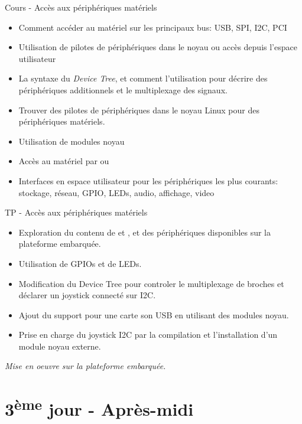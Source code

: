 \documentclass[a4paper,12pt,obeyspaces,spaces,hyphens]{article}
\begin{document}
\feagendatwocolumn
{Cours - Accès aux périphériques matériels}
{
  \begin{itemize}
  \item Comment accéder au matériel sur les principaux bus: USB, SPI,
    I2C, PCI
  \item Utilisation de pilotes de périphériques dans le noyau ou accès
    depuis l'espace utilisateur
  \item La syntaxe du {\em Device Tree}, et comment l'utilisation pour
    décrire des périphériques additionnels et le multiplexage des
    signaux.
  \item Trouver des pilotes de périphériques dans le noyau Linux pour
    des périphériques matériels.
  \item Utilisation de modules noyau
  \item Accès au matériel par  ou 
  \item Interfaces en espace utilisateur pour les périphériques les
    plus courants: stockage, réseau, GPIO, LEDs, audio, affichage,
    video
  \end{itemize}
}
{TP - Accès aux périphériques matériels}
{
  \begin{itemize}
  \item Exploration du contenu de  et , et des
    périphériques disponibles sur la plateforme embarquée.
  \item Utilisation de GPIOs et de LEDs.
  \item Modification du Device Tree pour controler le multiplexage
    de broches et déclarer un joystick connecté sur I2C.
  \item Ajout du support pour une carte son USB en utilisant des
    modules noyau.
  \item Prise en charge du joystick I2C par la compilation et
    l'installation d'un module noyau externe.
  \end{itemize}

  \vspace{0.5cm}
  {\em Mise en oeuvre sur la plateforme embarquée.}
}

\section{3\textsuperscript{ème} jour - Après-midi}
\end{document}
